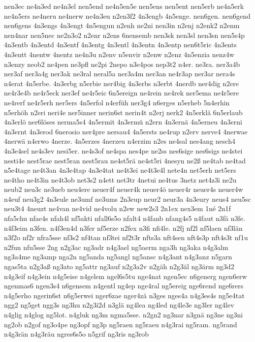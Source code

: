 {nen3ec
ne4n3ed
ne4n3el
nen5end
ne4n5en5e
nen5ens
nen5ent
nen5erb
ne4n5erk
ne4n5ers
ne4neru
ne4nerw
ne4n3eu
n2en3f2
4n3engb
4n5enge.
nen6gen.
nen6gend
nen6gens
4n3engs
4n3engt
4n5engun
n2enh
ne2ni
nen3in
n2enj
n2enk2
n2enm
nen4nar
nen5nec
ne2n3o2
n2enr
n2ens
6nensemb
nen3sk
nen3sl
nen3sn
nen5s4p
4n3entb
4n3entd
4n3entf
4n3entg
4n3entl
4n3entn
4n3entp
nen6t5ric
4n3ents
4n3entt
4nentw
4nentz
ne4n3u
n2env
n5envir
n2enw
n2enz
4n5enzia
nenz4w
n3enzy
neob2
ne4pen
ne3pfl
ne2pi
2nepo
n3e4pos
nep3t2
n4er.
ne3ra.
ner3a4b
ner3af
ner3a4g
ner3ak
ne3ral
neral5a
ner3a4m
ner3an
ne4r3ap
ner3ar
nera4s
n4erat
4n5erbe.
4n3erbg
n5erbie
ner4big
4n3erbs
n3erbt
4nerdb
ner4dig
n2ere
ne4r3e4b
ne4r5eck
ner3ef
ne4r5eic
6n5ereign
ne4rein
ne4rek
ner5ema
ne4r5ere
ne4rerf
ne4r5erh
ner5ers
4n5erfol
n4erfüh
ner3g4
n6erges
n5erheb
5n4erhin
n5erhöh
n2eri
neri4e
ner5inner
nerin6st
nerin4t
n2erj
nerk2
4n5erklä
6n5erlaub
4n3erlö
ner6löses
nerma5s4
4n5ermit
4n3ermü
n2ern
4n3ernä
4n5erneu
4n3erni
4n3ernt
4n3erod
6nerosio
ner4pre
nersau4
4n5ersts
ne4rup
n2erv
nerve4
4nerwae
4nerwä
n4erwo
4nerze.
4n5erzes
4nerzeu
n4erzim
n2es
ne4sal
nes4ang
nesch4
4n3e4sel
ne4s3ev
nesi5er.
ne4s3of
ne4spa
nes4pe
ne2ss
nes6sige
nes6sigs
ne4stei
nesti4e
nest5rae
nest5ran
nest5rau
ne4st5rä
ne4st5ri
4nesyn
ne2ß
ne4tab
ne4tad
n5e4tage
ne4t3an
4n3e4tap
4n3e4tat
ne4t3ei
ne4t3e4l
nete4n
net5erh
net5ers
ne4tho
ne4t3in
ne4t3ob
net3s2
n4ett
net3tr
4netui
ne4tus
3netz
net4z3i
ne2u
neub2
neu3c
ne3ueb
neu4ere
neuer4f
neuer4k
neuer4ö
neuer4r
neuer4s
neuer4w
n4euf
neu3g2
4n3eule
ne3umf
ne3ums
2n3eup
neur2
neur3a
4n3eury
neus4
neu5sc
neu3t4
4neuzt
ne4van
ne4vid
ne4volu
n2ew
new2s3
2n1ex
nex3em
1né
2n1f
nfa5chu
nfae4s
nfah4l
nf5akti
nfall6s5o
nfalt4
n4fanb
nfang4s5
n4faut
n3fä
n3fe.
n4f3eim
n3fen.
n4f3en4d
n3fer
nf5erze
n2fex
n3fi
nfi4le.
n2fj
nf2l
nf5laen
nf3län
n3f2o
nf2r
nfra5sse
nf3s2
nf4tan
nf3tei
nf2t3r
nfts3a
nft4sen
nft4s3p
nft4s3t
nf1u
n2fun
nfu5sse
2ng
n2g3ac
ng3adr
n4g3ael
ng5aerm
nga3h
ng3aka
n4g3alm
ng3a4me
ng3amp
nga2n
ng5anda
ng5angl
ng5ansc
n4g3ant
n4g3anz
n5garn
ngas5ta
n2g3aß
ng3ato
ng5attr
ng3auf
n2g3a2v
n2gäh
n2g3äl
ng3ärm
ng3d2
n4g3eif
n4g3ein
n4g5eise
n4gelem
ngel6s5tu
nge4nat
ngen5ec
n6generg
ngen6erw
ngenmas6
ngen3s4
n6gensem
n4gentl
ng4ep
nge4ral
ng5ereig
nge6rend
nge6rers
n4g5erho
ngerin6st
n6g5erwei
nger6zae
nger4zä
n3ges
nges4a
n4g3es4s
ng5e4tat
ngg2
ng5get
ngg3s
ng3hu
n2g3i2d
n3glä
ng4lea
ng4led
ng4le3e
ng3ler
ng4lev
n4glig
n4glog
ng5lot.
n4gluk
ng3m
ngma5sse.
n2gn2
ng3nar
n3gnä
ng3ne
ng3ni
ng2ob
n2gof
ng3o4pe
ng3opf
ng3p
ng5raen
ng5raeu
n4g3rai
ng5ram.
ng5rand
n4g3rän
n4g3räu
ngres6s5o
n5grif
ng3ris
ng3rob
}
